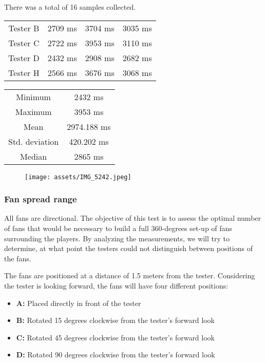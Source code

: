 There was a total of 16 samples collected.


\begin{center}
\begin{tabular}{|c|c|c|c|}
\hline
Tester B & 2709 ms & 3704 ms & 3035 ms \\ 
Tester C & 2722 ms & 3953 ms & 3110 ms \\ 
Tester D & 2432 ms & 2908 ms & 2682 ms \\ 
Tester H & 2566 ms & 3676 ms & 3068 ms \\ 
\hline
\end{tabular}
\end{center}

\begin{center}
\begin{tabular}{|c|c|}
\hline
Minimum & 2432 ms \\ 
Maximum & 3953 ms \\ 
Mean & 2974.188 ms \\ 
Std. deviation & 420.202 ms \\ 
Median & 2865 ms \\ 
\hline
\end{tabular}
\end{center}

\begin{figure}[h]{}
\centering\texttt{[image: assets/IMG\_5242.jpeg]}
\caption{}

\end{figure}

\hypertarget{x-fan-spread-range}{\subsubsection*{Fan spread range}}
All fans are directional. The objective of this test is to assess
the optimal number of fans that would be necessary to build a full 360-degrees
set-up of fans surrounding the players. By analyzing the measurements,
we will try to determine, at what point the testers could not distinguish
between positions of the fans.


The fans are positioned at a distance of 1.5 meters from the tester.
Considering the tester is looking forward, the fans will
have four different positions:


\begin{itemize}

\item \textbf{A:} Placed directly in front of the tester

\item \textbf{B:} Rotated 15 degrees clockwise from the tester’s forward look

\item \textbf{C:} Rotated 45 degrees clockwise from the tester’s forward look

\item \textbf{D:} Rotated 90 degrees clockwise from the tester’s forward look

\end{itemize}


